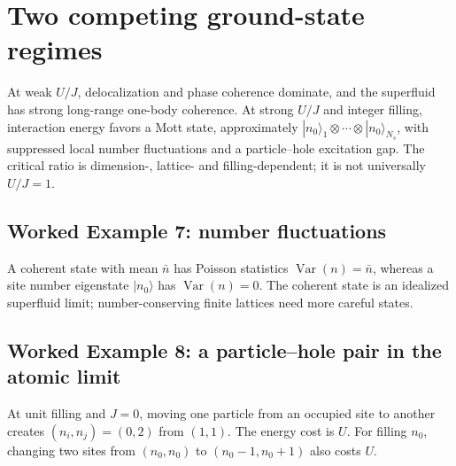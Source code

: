 \documentclass[11pt,a4paper]{article}
\newcommand{\ex}[1]{\subsection*{Worked Example #1}}
\begin{document}
\section{Two competing ground-state regimes}
At weak $U/J$, delocalization and phase coherence dominate, and the superfluid has strong long-range one-body coherence. At strong $U/J$ and integer filling, interaction energy favors a Mott state, approximately $|n_0\rangle_1\otimes\cdots\otimes|n_0\rangle_{N_s}$, with suppressed local number fluctuations and a particle--hole excitation gap. The critical ratio is dimension-, lattice- and filling-dependent; it is not universally $U/J=1$.
\begin{center}\end{center}
\ex{7: number fluctuations} A coherent state with mean $\bar n$ has Poisson statistics $\operatorname{Var}(n)=\bar n$, whereas a site number eigenstate $|n_0\rangle$ has $\operatorname{Var}(n)=0$. The coherent state is an idealized superfluid limit; number-conserving finite lattices need more careful states.
\ex{8: a particle--hole pair in the atomic limit} At unit filling and $J=0$, moving one particle from an occupied site to another creates $(n_i,n_j)=(0,2)$ from $(1,1)$. The energy cost is $U$. For filling $n_0$, changing two sites from $(n_0,n_0)$ to $(n_0-1,n_0+1)$ also costs $U$.
\end{document}
